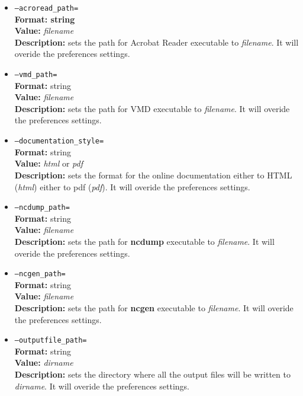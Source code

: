 \documentclass[a4paper,11pt]{report}
\begin{document}
\begin{itemize}
\item{\texttt {--acroread\_path=}}\\
\textbf{Format: string} \\
\textbf{Value:} \textit{filename}\\
\textbf{Description:} sets the path for Acrobat Reader executable to \textit{filename}. It will overide the preferences settings.

\item{\texttt {--vmd\_path=}}\\
\textbf{Format:} string\\
\textbf{Value:} \textit{filename}\\
\textbf{Description:} sets the path for VMD executable to \textit{filename}. It will overide the preferences settings.

\item{\texttt {--documentation\_style=}}\\
\textbf{Format:} string\\
\textbf{Value:} \textit{html} or \textit{pdf}\\
\textbf{Description:} sets the format for the online documentation either to HTML (\textit{html}) either to pdf 
(\textit{pdf}). It will overide the preferences settings.

\item{\texttt {--ncdump\_path=}}\\
\textbf{Format:} string\\
\textbf{Value:} \textit{filename}\\
\textbf{Description:} sets the path for \textbf{ncdump} executable to \textit{filename}. It will overide the preferences 
settings.

\item{\texttt {--ncgen\_path=}}\\
\textbf{Format:} string\\
\textbf{Value:} \textit{filename}\\
\textbf{Description:} sets the path for \textbf{ncgen} executable to \textit{filename}. It will overide the preferences 
settings.

\item{\texttt {--outputfile\_path=}}\\
\textbf{Format:} string\\
\textbf{Value:} \textit{dirname}\\
\textbf{Description:} sets the directory where all the output files will be written to \textit{dirname}. It will overide the 
preferences settings.


\end{itemize}
\end{document}
